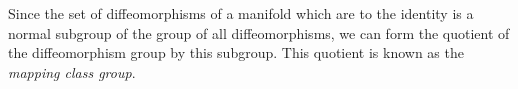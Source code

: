 \documentclass[12pt]{article}
\begin{document}
Since the set of diffeomorphisms of a manifold which are  to the identity is a normal subgroup of the group of all diffeomorphisms, we can form the quotient of the diffeomorphism group by this subgroup.  This quotient is known as the \emph{ mapping class group}.
\end{document}
